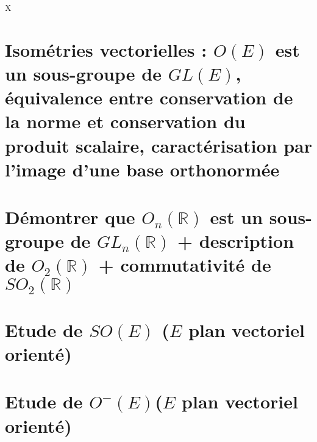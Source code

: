 X\documentclass{article}
\begin{document}
\section{Isométries vectorielles : $O(E)$ est un sous-groupe de $GL(E)$, équivalence entre conservation de la norme et conservation du produit scalaire, caractérisation par l'image d'une base orthonormée}
\section{Démontrer que $O_n(\mathbb R)$ est un sous-groupe de $GL_n(\mathbb R)$ + description de $O_2 (\mathbb R)$ + commutativité de $SO_2(\mathbb R)$}
\section{Etude de $SO(E)$ ($E$ plan vectoriel orienté)}
\section{Etude de $O^-(E)$($E$ plan vectoriel orienté)}
\end{document}
